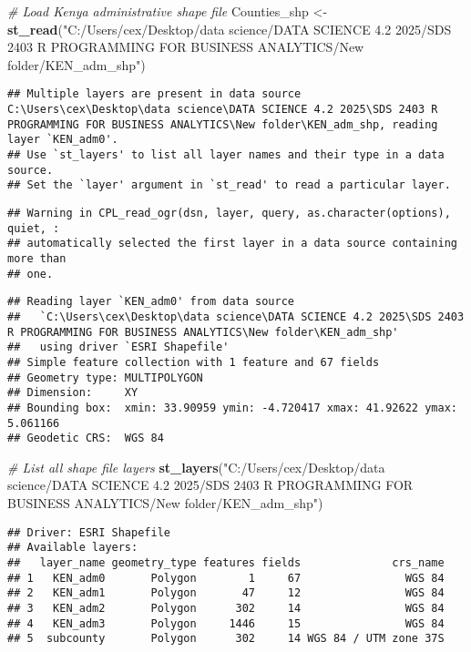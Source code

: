 \documentclass[
]{article}
\newenvironment{Shaded}{\begin{snugshade}}{\end{snugshade}}
\newcommand{\CommentTok}[1]{\textcolor[rgb]{0.56,0.35,0.01}{\textit{#1}}}
\newcommand{\FunctionTok}[1]{\textcolor[rgb]{0.13,0.29,0.53}{\textbf{#1}}}
\newcommand{\NormalTok}[1]{#1}
\newcommand{\OtherTok}[1]{\textcolor[rgb]{0.56,0.35,0.01}{#1}}
\newcommand{\StringTok}[1]{\textcolor[rgb]{0.31,0.60,0.02}{#1}}
\begin{document}
\begin{Shaded}
\begin{Highlighting}[]
\CommentTok{\# Load Kenya administrative shape file}
\NormalTok{Counties\_shp }\OtherTok{\textless{}{-}} \FunctionTok{st\_read}\NormalTok{(}\StringTok{"C:/Users/cex/Desktop/data science/DATA SCIENCE 4.2 2025/SDS 2403 R PROGRAMMING FOR BUSINESS ANALYTICS/New folder/KEN\_adm\_shp"}\NormalTok{)}
\end{Highlighting}
\end{Shaded}

\begin{verbatim}
## Multiple layers are present in data source C:\Users\cex\Desktop\data science\DATA SCIENCE 4.2 2025\SDS 2403 R PROGRAMMING FOR BUSINESS ANALYTICS\New folder\KEN_adm_shp, reading layer `KEN_adm0'.
## Use `st_layers' to list all layer names and their type in a data source.
## Set the `layer' argument in `st_read' to read a particular layer.
\end{verbatim}

\begin{verbatim}
## Warning in CPL_read_ogr(dsn, layer, query, as.character(options), quiet, :
## automatically selected the first layer in a data source containing more than
## one.
\end{verbatim}

\begin{verbatim}
## Reading layer `KEN_adm0' from data source 
##   `C:\Users\cex\Desktop\data science\DATA SCIENCE 4.2 2025\SDS 2403 R PROGRAMMING FOR BUSINESS ANALYTICS\New folder\KEN_adm_shp' 
##   using driver `ESRI Shapefile'
## Simple feature collection with 1 feature and 67 fields
## Geometry type: MULTIPOLYGON
## Dimension:     XY
## Bounding box:  xmin: 33.90959 ymin: -4.720417 xmax: 41.92622 ymax: 5.061166
## Geodetic CRS:  WGS 84
\end{verbatim}

\begin{Shaded}
\begin{Highlighting}[]
\CommentTok{\# List all shape file layers}
\FunctionTok{st\_layers}\NormalTok{(}\StringTok{"C:/Users/cex/Desktop/data science/DATA SCIENCE 4.2 2025/SDS 2403 R PROGRAMMING FOR BUSINESS ANALYTICS/New folder/KEN\_adm\_shp"}\NormalTok{)}
\end{Highlighting}
\end{Shaded}

\begin{verbatim}
## Driver: ESRI Shapefile 
## Available layers:
##   layer_name geometry_type features fields              crs_name
## 1   KEN_adm0       Polygon        1     67                WGS 84
## 2   KEN_adm1       Polygon       47     12                WGS 84
## 3   KEN_adm2       Polygon      302     14                WGS 84
## 4   KEN_adm3       Polygon     1446     15                WGS 84
## 5  subcounty       Polygon      302     14 WGS 84 / UTM zone 37S
\end{verbatim}
\end{document}
